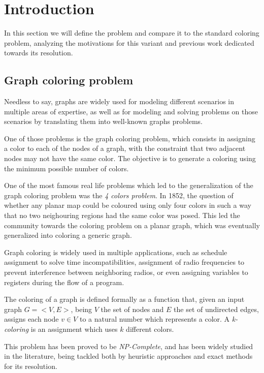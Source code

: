 
\section{Introduction}
\label{sec:introduction}

In this section we will define the problem and compare it to the standard coloring problem, analyzing the motivations for this variant and previous work dedicated towards its resolution.

\subsection{Graph coloring problem}

Needless to say, graphs are widely used for modeling different scenarios in multiple areas of expertise, as well as for modeling and solving problems on those scenarios by translating them into well-known graphs problems. 

One of those problems is the graph coloring problem, which consists in assigning a color to each of the nodes of a graph, with the constraint that two adjacent nodes may not have the same color. The objective is to generate a coloring using the minimum possible number of colors.

One of the most famous real life problems which led to the generalization of the graph coloring problem was the \textit{4 colors problem}. In 1852, the question of whether any planar map could be coloured using only four colors in such a way that no two neighouring regions had the same color was posed. This led the community towards the coloring problem on a planar graph, which was eventually generalized into coloring a generic graph.

Graph coloring is widely used in multiple applications, such as schedule assignment to solve time incompatibilities, assignment of radio frequencies to prevent interference between neighboring radios, or even assigning variables to registers during the flow of a program.

The coloring of a graph is defined formally as a function that, given an input graph $G = <V,E>$, being $V$ the set of nodes and $E$ the set of undirected edges, assigns each node $v \in V$ to a natural number which represents a color. A \textit{k-coloring} is an assignment which uses $k$ different colors.

This problem has been proved to be \textit{NP-Complete}, and has been widely studied in the literature, being tackled both by heuristic approaches and exact methods for its resolution.

